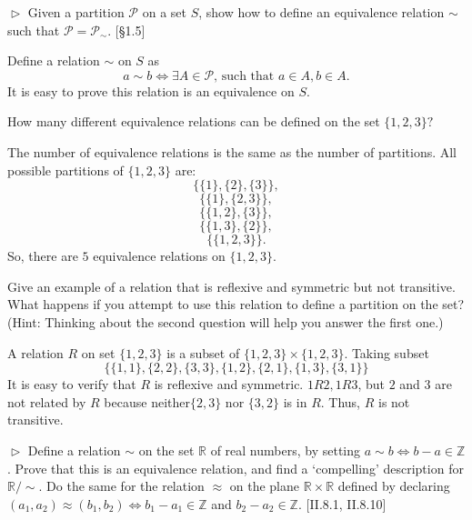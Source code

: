 \hypertarget{Exercise I.1.3}{}
\begin{problem}[1.3]
	$\vartriangleright$ Given a partition $\mathscr{P}$ on a set $S$, show how to define an equivalence 
	relation $\sim$ such that $\mathscr{P} = \mathscr{P}_{\sim}$. [\S1.5]
\end{problem}

\begin{solution}
Define a relation $\sim$ on $S$ as
$$a\sim b \iff  \exists A\in \mathscr{P}\text{, such that } a\in A, b\in A.$$
It is easy to prove this relation is an equivalence on $S$.
\end{solution}


\begin{problem}[1.4]
	How many different equivalence relations can be defined on the set $\{1,2,3\}?$
\end{problem}

\begin{solution}
The number of equivalence relations is the same as the number of partitions. All possible partitions of $\{1,2,3\}$ are:
$$\{\{1\}, \{2\}, \{3\}\},$$
$$\{\{1\}, \{2,3\}\},$$
$$\{\{1,2\},\{3\}\},$$
$$\{\{1,3\}, \{2\}\},$$
$$\{\{1,2,3\}\}.$$
So, there are $5$ equivalence relations on $\{1,2,3\}$.
\end{solution}

\begin{problem}[1.5]
	Give an example of a relation that is reflexive and symmetric but not
	transitive. What happens if you attempt to use this relation to define a
	partition on the set? (Hint: Thinking about the second question will help you
	answer the first one.)
\end{problem}

\begin{solution}
A relation $R$ on set $\{1,2,3\}$ is a subset  of $\{1,2,3\}\times \{1,2,3\}$. Taking subset 
$$\{\{1,1\}, \{2,2\}, \{3,3\}, \{1,2\},\{2,1\},\{1,3\}, \{3,1\}\}$$
It is easy to verify that $R$ is reflexive and symmetric. $1R2, 1R3$, but $2$ and $3$ are not related by $R$
because neither$\{2,3\}$ nor $\{3,2\}$ is in $R$. Thus, $R$ is not transitive.
\end{solution}

\hypertarget{Exercise I.1.6}{}
\begin{problem}[1.6]
$\vartriangleright$ Define a relation $\sim$ on the set $\mathbb{R}$ of real numbers, by 
setting $a\sim b\iff b-a \in\mathbb{Z}$. 
Prove that this is an equivalence relation, and find a \textquoteleft compelling' description for $\mathbb{R}/\sim$. 
Do the same for the relation $\approx$ on the plane $\mathbb{R}\times\mathbb{R}$ defined by declaring 
$(a_1, a_2)\approx(b_1, b_2)\iff b_1-a_1 \in\mathbb{Z}$ and $b_2-a_2 \in\mathbb{Z}$. [\textsection II.8.1, II.8.10]
\end{problem}

